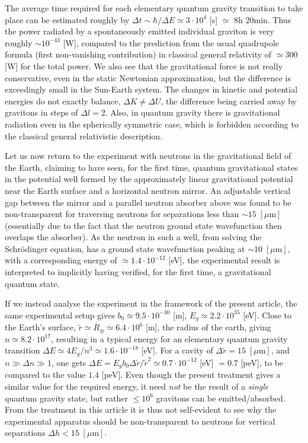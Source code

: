	The average time required for each elementary quantum gravity transition to take place can be estimated roughly by $\Delta t\sim \hbar/\Delta E \simeq 3 \cdot 10^4$ [s] $\simeq$ 8h 20min.	Thus the power radiated by a spontaneously emitted individual graviton is very roughly $\sim 10^{-43}$ [W], compared to the
prediction from the usual quadrupole formula (first non-vanishing contribution) in classical general relativity of $\simeq 300$ [W] for the total power. We also see that the gravitational force is not really conservative, even in the static Newtonian approximation, but the difference is exceedingly small in the	Sun-Earth system. The changes in kinetic and potential energies do not exactly balance, $\Delta K \neq \Delta U$, the difference being carried away by gravitons in steps of $\Delta l = 2$. Also,	in quantum gravity there is gravitational radiation even in the spherically symmetric case, which is forbidden according to the classical general relativistic description.
	
	Let us now return to the experiment with neutrons in the gravitational field of the Earth, claiming to have seen, for the first time, quantum gravitational states in the potential well formed by the approximately linear gravitational	potential near the Earth surface and a horizontal neutron mirror. An adjustable vertical gap between the mirror and a parallel neutron absorber above was found to be non-transparent for traversing neutrons for separations less than $\sim 15\;[\mu \text{m}]$ (essentially due to the fact that the neutron ground state wavefunction then overlaps the absorber). As the neutron in such a well, from solving the Schr\"{o}dinger equation, has a ground state wavefunction peaking at $\sim 10 \;[\mu \text{m}]$, with a corresponding energy of $\simeq 1.4 \cdot 10^{-12}$ [eV], the experimental result is interpreted to implicitly having verified, for the first time, a gravitational quantum state.
	
	If we instead analyse the experiment in the framework of the present article, the same experimental setup gives $b_0 \simeq 9.5 \cdot 10^{-30}$ [m], $E_g \simeq 2.2 \cdot 10^{35}$ [eV]. Close to the Earth's surface, $\tilde{r} \simeq R_{\oplus} \simeq 6.4 \cdot 10^6$ [m], the radius of the earth, giving $n \simeq 8.2 \cdot 10^{17}$, resulting in a typical energy for an elementary quantum gravity transition $\Delta E \simeq 4 E_g /n^3 \simeq 1.6 \cdot 10^{-18}$ [eV]. For a cavity of $\Delta \tilde{r} = 15 \;[\mu \text{m}]$, and $n \gg \Delta n \gg 1$, one gets $\Delta E = E_g b_0 \Delta \tilde{r} /\tilde{r}^2 \simeq 0.7 \cdot 10^{-12}$ [eV] $=0.7$ [peV], to be compared to the value $1.4$ [peV]. Even though the present treatment gives a similar value for the required energy, it need \textit{not} be the result of a \textit{single} quantum gravity state, but rather $\leq 10^6$ gravitons can be emitted/absorbed. From the treatment in this article it is thus 	not self-evident to see why the experimental apparatus should be non-transparent to neutrons for
	vertical separations $\Delta h < 15 \;[\mu \text{m}]$.
	

